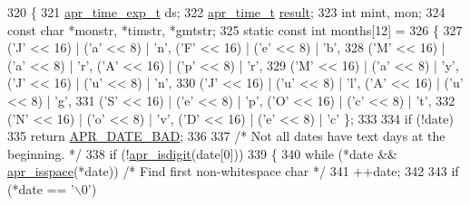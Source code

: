 \begin{DoxyCode}
320 \{
321     \hyperlink{structapr__time__exp__t}{apr\_time\_exp\_t} ds;
322     \hyperlink{group__apr__time_gadb4bde16055748190eae190c55aa02bb}{apr\_time\_t} \hyperlink{group__APACHE__CORE__MPM_ga9f5959dd76d5c83e775dcf44de684686}{result};
323     \textcolor{keywordtype}{int} mint, mon;
324     \textcolor{keyword}{const} \textcolor{keywordtype}{char} *monstr, *timstr, *gmtstr;
325     \textcolor{keyword}{static} \textcolor{keyword}{const} \textcolor{keywordtype}{int} months[12] =
326     \{
327     (\textcolor{charliteral}{'J'} << 16) | (\textcolor{charliteral}{'a'} << 8) | \textcolor{charliteral}{'n'}, (\textcolor{charliteral}{'F'} << 16) | (\textcolor{charliteral}{'e'} << 8) | \textcolor{charliteral}{'b'},
328     (\textcolor{charliteral}{'M'} << 16) | (\textcolor{charliteral}{'a'} << 8) | \textcolor{charliteral}{'r'}, (\textcolor{charliteral}{'A'} << 16) | (\textcolor{charliteral}{'p'} << 8) | \textcolor{charliteral}{'r'},
329     (\textcolor{charliteral}{'M'} << 16) | (\textcolor{charliteral}{'a'} << 8) | \textcolor{charliteral}{'y'}, (\textcolor{charliteral}{'J'} << 16) | (\textcolor{charliteral}{'u'} << 8) | \textcolor{charliteral}{'n'},
330     (\textcolor{charliteral}{'J'} << 16) | (\textcolor{charliteral}{'u'} << 8) | \textcolor{charliteral}{'l'}, (\textcolor{charliteral}{'A'} << 16) | (\textcolor{charliteral}{'u'} << 8) | \textcolor{charliteral}{'g'},
331     (\textcolor{charliteral}{'S'} << 16) | (\textcolor{charliteral}{'e'} << 8) | \textcolor{charliteral}{'p'}, (\textcolor{charliteral}{'O'} << 16) | (\textcolor{charliteral}{'c'} << 8) | \textcolor{charliteral}{'t'},
332     (\textcolor{charliteral}{'N'} << 16) | (\textcolor{charliteral}{'o'} << 8) | \textcolor{charliteral}{'v'}, (\textcolor{charliteral}{'D'} << 16) | (\textcolor{charliteral}{'e'} << 8) | \textcolor{charliteral}{'c'} \};
333 
334     \textcolor{keywordflow}{if} (!date)
335         \textcolor{keywordflow}{return} \hyperlink{group__APR__Util__Date_ga8be88b25f4b477ad13c4067c959411b0}{APR\_DATE\_BAD};
336 
337     \textcolor{comment}{/* Not all dates have text days at the beginning. */}
338     \textcolor{keywordflow}{if} (!\hyperlink{group__apr__ctype_ga8c453b1d66015b357c3d3a3ddb7d97d7}{apr\_isdigit}(date[0]))
339     \{
340         \textcolor{keywordflow}{while} (*date && \hyperlink{group__apr__ctype_ga23f4c7721923a0f0f444fd7fb196047a}{apr\_isspace}(*date)) \textcolor{comment}{/* Find first non-whitespace char */}
341             ++date;
342 
343         \textcolor{keywordflow}{if} (*date == \textcolor{charliteral}{'\(\backslash\)0'}) 

\end{DoxyCode}
